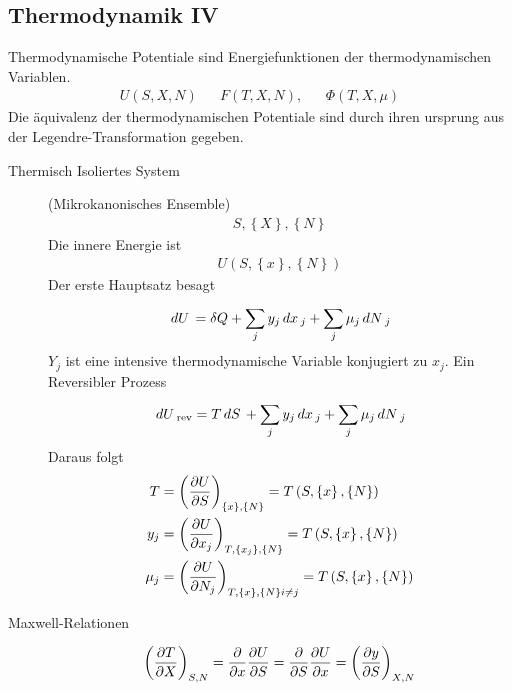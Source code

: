 \subsection*{Thermodynamik IV}
Thermodynamische Potentiale sind Energiefunktionen der thermodynamischen
Variablen.
%
\begin{align*}
  U(S,X,N) && F(T, X, N), && \Phi(T,X, \mu)
\end{align*}
%
Die äquivalenz der thermodynamischen Potentiale sind durch ihren ursprung
aus der Legendre-Transformation gegeben.
\begin{description}
  \item[Thermisch Isoliertes System] (Mikrokanonisches Ensemble)
    \begin{align*}
      S, \left\{ X \right\}, \left\{ N \right\}
    \end{align*}
    Die innere Energie ist %
    \begin{align*}
      U(S, \left\{ x \right\}, \left\{ N \right\})
    \end{align*}
    Der erste Hauptsatz besagt
    \begin{align*}
      \,dU\, = \delta Q + \sum_{j}^{} y_j \,dx\,_j + \sum_{j}^{} \mu_j \,d N\,_j 
    \end{align*}
    $Y_j$ ist eine intensive thermodynamische Variable konjugiert zu $x_j$.
    Ein Reversibler Prozess
    \begin{align*}
      \,dU\,_{\text{rev}} = T \,dS\, + \sum_{j}^{} y_j \,dx\,_j + 
      \sum_{j}^{} \mu_j \,dN\,_j
    \end{align*}
    Daraus folgt
    \begin{align*}
      T & = \left( \frac{\partial U }{\partial S} \right)_{ \left\{ x \right\}, \left\{ N \right\} }
      = T \left( S, \left\{ x \right\}, \left\{ N \right\} \right) \\
      y_j & = \left( \frac{\partial U }{\partial x_j} \right)_{ T, \left\{ x_j \right\}, \left\{ N \right\} }
      = T \left( S, \left\{ x \right\}, \left\{ N \right\} \right) \\
      \mu_j & = \left( \frac{\partial U }{\partial N_j} \right)_{ T, \left\{ x \right\}, \left\{ N \right\} i \neq j }
      = T \left( S, \left\{ x \right\}, \left\{ N \right\} \right) \\
    \end{align*}
  \item[Maxwell-Relationen] 
    \begin{align*}
      \left( \pd{T}{X} \right)_{S, N} = \pd{}{x} \pd{U}{S} = 
      \pd{}{S} \pd{U}{x} = \left( \pd{y}{S} \right)_{X, N}

\end{align*}
\end{description}
